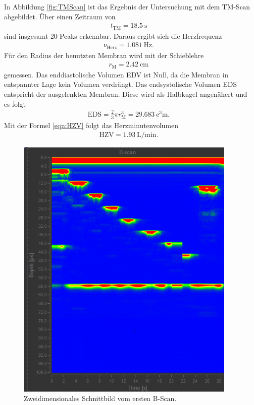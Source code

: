 In Abbildung \ref{fig:TMScan} ist das Ergebnis der Untersuchung mit dem TM-Scan
abgebildet. Über einen Zeitraum von
\begin{align}
  t_\text{TM} = \SI{18.5}{\second}
\end{align}
sind insgesamt 20 Peaks erkennbar.
Daraus ergibt sich die Herzfrequenz
\begin{align}
  \nu_\text{Herz} = \SI{1.081}{\hertz}.
\end{align}
Für den Radius der benutzten Membran wird mit der Schieblehre
\begin{align}
  r_\text{M} = \SI{2.42}{\centi\meter}
\end{align}
gemessen.
Das enddiastolische Volumen EDV ist Null, da die Membran in entspannter
Lage kein Volumen verdrängt.
Das endsystolische Volumen EDS entspricht der ausgelenkten Membran. Diese
wird als Halbkugel angenähert und es folgt
\begin{align}
  \text{EDS} = \frac{2}{3} \pi r_\text{M}^3 = \SI{29.683}{\cubic\centi\meter}.
\end{align}
Mit der Formel \eqref{eqn:HZV} folgt das Herzminutenvolumen
\begin{align}
  \text{HZV} = \SI{1.93}{\liter\per\minute}.
\end{align}

\begin{figure}
  \centering
  \includegraphics[height=13cm]{Daten/B-Scan1.png}
  \caption{Zweidimensionales Schnittbild vom ersten B-Scan.}
  \label{fig:BScan1}
\end{figure}

